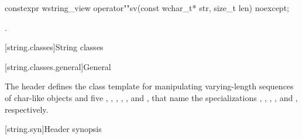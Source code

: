 %
\begin{itemdecl}
constexpr wstring_view operator""sv(const wchar_t* str, size_t len) noexcept;
\end{itemdecl}
\begin{itemdescr}
\pnum
\returns
{}.
\end{itemdescr}

[string.classes]{String classes}

[string.classes.general]{General}

\pnum
The header  defines the
 class template for manipulating
varying-length sequences of char-like objects and five
, ,
,
,
,
and , that name
the specializations
,
,
,
,
and
, respectively.

[string.syn]{Header  synopsis}
%

